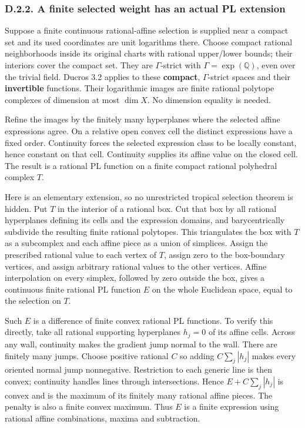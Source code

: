 \documentclass[
  10pt,
]{article}
\begin{document}
\subsubsection{D.2.2. A finite selected weight has an actual PL
extension}\label{d.2.2.-a-finite-selected-weight-has-an-actual-pl-extension}

Suppose a finite continuous rational-affine selection is supplied near a
compact set and its used coordinates are unit logarithms there. Choose
compact rational neighborhoods inside its original charts with rational
upper/lower bounds; their interiors cover the compact set. They are
\(\Gamma\)-strict with \(\Gamma=\exp(\mathbb Q)\), even over the trivial
field. Ducros 3.2 applies to these \textbf{compact}, \(\Gamma\)-strict
spaces and their \textbf{invertible} functions. Their logarithmic images
are finite rational polytope complexes of dimension at most \(\dim X\).
No dimension equality is needed.

Refine the images by the finitely many hyperplanes where the selected
affine expressions agree. On a relative open convex cell the distinct
expressions have a fixed order. Continuity forces the selected
expression class to be locally constant, hence constant on that cell.
Continuity supplies its affine value on the closed cell. The result is a
rational PL function on a finite compact rational polyhedral complex
\(T\).

Here is an elementary extension, so no unrestricted tropical selection
theorem is hidden. Put \(T\) in the interior of a rational box. Cut that
box by all rational hyperplanes defining its cells and the expression
domains, and barycentrically subdivide the resulting finite rational
polytopes. This triangulates the box with \(T\) as a subcomplex and each
affine piece as a union of simplices. Assign the prescribed rational
value to each vertex of \(T\), assign zero to the box-boundary vertices,
and assign arbitrary rational values to the other vertices. Affine
interpolation on every simplex, followed by zero outside the box, gives
a continuous finite rational PL function \(E\) on the whole Euclidean
space, equal to the selection on \(T\).

Such \(E\) is a difference of finite convex rational PL functions. To
verify this directly, take all rational supporting hyperplanes \(h_j=0\)
of its affine cells. Across any wall, continuity makes the gradient jump
normal to the wall. There are finitely many jumps. Choose positive
rational \(C\) so adding \(C\sum_j|h_j|\) makes every oriented normal
jump nonnegative. Restriction to each generic line is then convex;
continuity handles lines through intersections. Hence \(E+C\sum_j|h_j|\)
is convex and is the maximum of its finitely many rational affine
pieces. The penalty is also a finite convex maximum. Thus \(E\) is a
finite expression using rational affine combinations, maxima and
subtraction.
\end{document}
